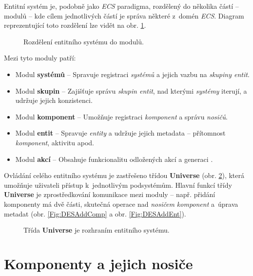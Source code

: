 Entitní systém je, podobně jako \emph{ECS} paradigma, rozdělený do několika částí -- modulů -- kde cílem jednotlivých částí je správa některé z~domén \emph{ECS}. Diagram reprezentující toto rozdělení lze vidět na obr. \ref{Fig:DESModules}.

\begin{figure}[H]
	\centering
	\caption{Rozdělení entitního systému do modulů.}
	\label{Fig:DESModules}
\end{figure}

\pagebreak

\noindent Mezi tyto moduly patří:

\begin{itemize}
	\item Modul \textbf{systémů} -- Spravuje registraci \emph{systémů} a jejich vazbu na \emph{skupiny entit}. 
	\item Modul \textbf{skupin} -- Zajišťuje správu \emph{skupin entit}, nad kterými \emph{systémy} iterují, a udržuje jejich konzistenci.
	\item Modul \textbf{komponent} -- Umožňuje registraci \emph{komponent} a správu \emph{nosičů}.
	\item Modul \textbf{entit} -- Spravuje \emph{entity} a udržuje jejich metadata -- přítomnost \emph{komponent}, aktivitu apod.
	\item Modul \textbf{akcí} -- Obsahuje funkcionalitu odložených akcí a generaci .
\end{itemize}

Ovládání celého entitního systému je zastřešeno třídou \textbf{Universe} (obr. \ref{Fig:DESUniverse}), která umožňuje uživateli přístup k~jednotlivým podsystémům. Hlavní funkcí třídy \textbf{Universe} je zprostředkování komunikace mezi moduly -- např. přidání komponenty má dvě části, skutečná operace nad \emph{nosičem komponent} a~úprava metadat (obr. \ref{Fig:DESAddComp} a obr. \ref{Fig:DESAddEnt}). 

\begin{figure}[H]
	\centering
	\caption{Třída \textbf{Universe} je rozhraním entitního systému.}
	\label{Fig:DESUniverse}
\end{figure}

\section{Komponenty a jejich nosiče}

